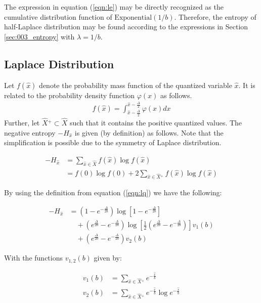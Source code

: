 The expression in equation (\ref{eqn:le}) may be directly recognized as the cumulative distribution function of $\text{Exponential}(1/b)$. Therefore, the entropy of half-Laplace distribution may be found according to the expressions in Section \ref{sec:003_entropy} with $\lambda = 1/b$. 

\subsection{Laplace Distribution}

Let $f(\hat{x})$ denote the probability mass function of the quantized variable $\hat{x}$. It is related to the probability density function $\varphi(x)$ as follows.
\begin{align} f(\hat{x}) = \int_{\hat{x} - \frac{\Delta}{2}}^{\hat{x} - \frac{\Delta}{2}} \varphi(x) dx \label{eqn:lq} \end{align}
Further, let $\hat{X}{}^+ \subset \hat{X}$ such that it contains the positive quantized values. The negative entropy $-H_{\hat{x}}$ is given (by definition) as follows. Note that the simplification is possible due to the symmetry of Laplace distribution.

\begin{align} -H_{\hat{x}} &= \sum_{\hat{x} \in \hat{X}} f(\hat{x}) \log f(\hat{x}) \\ &= f(0) \log f(0) + 2 \sum_{\hat{x} \in \hat{X}{}^+} f(\hat{x}) \log f(\hat{x}) \end{align}

By using the definition from equation (\ref{eqn:lq}) we have the following:

\begin{align} -H_{\hat{x}} &= \left(1 - e^{-\frac{\Delta}{2b}}\right) \log \left[1 - e^{-\frac{\Delta}{2b}} \right] \nonumber\\ &\quad +  \left(e^{\frac{\Delta}{2b}} - e^{-\frac{\Delta}{2b}}\right) \log \left[ \frac{1}{2} \left(e^{\frac{\Delta}{2b}} - e^{-\frac{\Delta}{2b}}\right) \right] v_1(b) \nonumber\\ &\quad + \left(e^{\frac{\Delta}{2b}} - e^{-\frac{\Delta}{2b}}\right) v_2(b) \end{align}

With the functions $v_{1,2}(b)$ given by:

\begin{align} v_1(b) &= \sum_{\hat{x} \in \hat{X}{}^+} e^{-\frac{\hat{x}}{b}} \\ v_2(b) &= \sum_{\hat{x} \in \hat{X}{}^+} e^{-\frac{\hat{x}}{b}} \log e^{-\frac{\hat{x}}{b}} \end{align}

